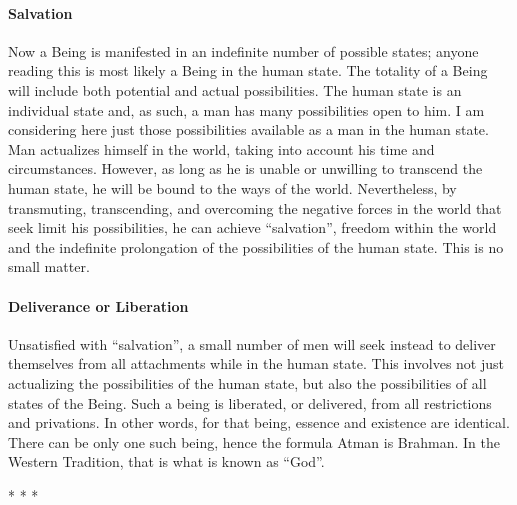 \paragraph{Salvation}
Now a Being is manifested in an indefinite number of possible states; anyone reading this is most likely a Being in the human state. The totality of a Being will include both potential and actual possibilities. The human state is an individual state and, as such, a man has many possibilities open to him. I am considering here just those possibilities available as a man in the human state. Man actualizes himself in the world, taking into account his time and circumstances. However, as long as he is unable or unwilling to transcend the human state, he will be bound to the ways of the world. Nevertheless, by transmuting, transcending, and overcoming the negative forces in the world that seek limit his possibilities, he can achieve “salvation”, freedom within the world and the indefinite prolongation of the possibilities of the human state. This is no small matter.

\paragraph{Deliverance or Liberation}
Unsatisfied with “salvation”, a small number of men will seek instead to deliver themselves from all attachments while in the human state. This involves not just actualizing the possibilities of the human state, but also the possibilities of all states of the Being. Such a being is liberated, or delivered, from all restrictions and privations. In other words, for that being, essence and existence are identical. There can be only one such being, hence the formula Atman is Brahman. In the Western Tradition, that is what is known as “God”.


\begin{center}* * *\end{center}


